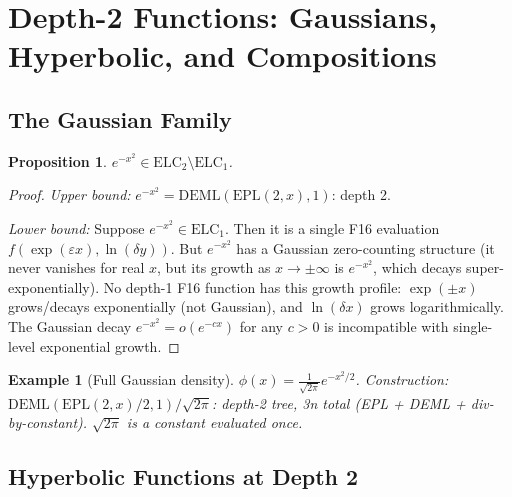 \documentclass[11pt]{article}
\newtheorem{proposition}[theorem]{Proposition}
\newtheorem{example}[theorem]{Example}
\begin{document}
\section{Depth-2 Functions: Gaussians, Hyperbolic, and Compositions}
\label{sec:depth2}

\subsection{The Gaussian Family}

\begin{proposition}
$e^{-x^2} \in \mathrm{ELC}_2 \setminus \mathrm{ELC}_1$.
\end{proposition}

\begin{proof}
\textit{Upper bound:} $e^{-x^2} = \mathrm{DEML}(\mathrm{EPL}(2,x), 1)$: depth 2.

\textit{Lower bound:} Suppose $e^{-x^2} \in \mathrm{ELC}_1$.
Then it is a single F16 evaluation $f(\exp(\varepsilon x), \ln(\delta y))$.
But $e^{-x^2}$ has a Gaussian zero-counting structure (it never vanishes for real $x$,
but its growth as $x \to \pm\infty$ is $e^{-x^2}$, which decays super-exponentially).
No depth-1 F16 function has this growth profile:
$\exp(\pm x)$ grows/decays exponentially (not Gaussian), and $\ln(\delta x)$
grows logarithmically. The Gaussian decay $e^{-x^2} = o(e^{-cx})$ for any $c > 0$
is incompatible with single-level exponential growth.
\end{proof}

\begin{example}[Full Gaussian density]
$\phi(x) = \frac{1}{\sqrt{2\pi}} e^{-x^2/2}$.
Construction: $\mathrm{DEML}(\mathrm{EPL}(2,x)/2, 1) / \sqrt{2\pi}$:
depth-2 tree, 3n total (EPL + DEML + div-by-constant).
$\sqrt{2\pi}$ is a constant evaluated once.
\end{example}

\subsection{Hyperbolic Functions at Depth 2}
\end{document}
